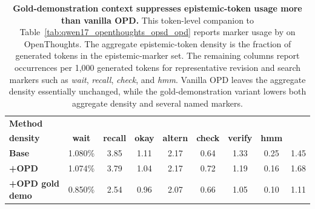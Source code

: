 \begin{table}[t]
\centering
\caption{\textbf{Gold-demonstration context suppresses epistemic-token usage more than vanilla OPD.}
This token-level companion to Table~\ref{tab:qwen17_openthoughts_opsd_opd} reports marker usage by \qwenonesevenb{} on OpenThoughts. The aggregate epistemic-token density is the fraction of generated tokens in the epistemic-marker set. The remaining columns report occurrences per 1,000 generated tokens for representative revision and search markers such as \textit{wait}, \textit{recall}, \textit{check}, and \textit{hmm}. Vanilla OPD leaves the aggregate density essentially unchanged, while the gold-demonstration variant lowers both aggregate density and several named markers.}
\label{tab:qwen17_openthoughts_epistemic_tokens}
\scriptsize
\setlength{\tabcolsep}{3pt}
\renewcommand{\arraystretch}{1.12}

\begin{tabular*}{\textwidth}{@{\extracolsep{\fill}}lcccccccc@{}}
\toprule
\textbf{Method}
& \shortstack{\textbf{Epistemic token}\\[-1pt]\textbf{density}}
& \textbf{wait}
& \textbf{recall}
& \textbf{okay}
& \textbf{altern}
& \textbf{check}
& \textbf{verify}
& \textbf{hmm} \\
\midrule
\textbf{Base}
& 1.080\%
& 3.85
& 1.11
& 2.17
& 0.64
& 1.33
& 0.25
& 1.45 \\
\textbf{+OPD}
& 1.074\%
& 3.79
& 1.04
& 2.17
& 0.72
& 1.19
& 0.16
& 1.68 \\
\textbf{+OPD gold demo}
& 0.850\%
& 2.54
& 0.96
& 2.07
& 0.66
& 1.05
& 0.10
& 1.11 \\
\bottomrule
\end{tabular*}
\end{table}
